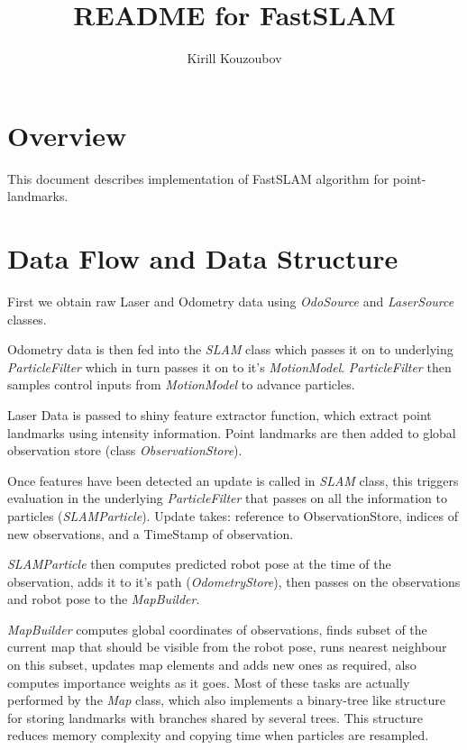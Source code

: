 \documentclass{article}
\title{README for FastSLAM}
\author{Kirill Kouzoubov}
\begin{document}
\date{}
\maketitle

\section{Overview}

This document describes implementation of FastSLAM algorithm for
point-landmarks.

\section{Data Flow and Data Structure}
First we obtain raw Laser and Odometry data using \textit{OdoSource}
and \textit{LaserSource} classes. 

Odometry data is then fed into the \textit{SLAM} class which passes it
on to underlying \textit{ParticleFilter} which in turn passes it on
to it's \textit{MotionModel}. \textit{ParticleFilter} then samples
control inputs from \textit{MotionModel} to advance particles.

Laser Data is passed to shiny feature extractor function, which
extract point landmarks using intensity information. Point landmarks
are then added to global observation store (class
\textit{ObservationStore}).

Once features have been detected an update is called in \textit{SLAM}
class, this triggers evaluation in the underlying
\textit{ParticleFilter} that passes on all the information to
particles (\textit{SLAMParticle}). Update takes: reference to
ObservationStore, indices of new observations, and a TimeStamp of
observation. 

\textit{SLAMParticle} then computes predicted robot pose at the time
of the observation, adds it to it's path (\textit{OdometryStore}),
then passes on the observations and robot pose to the
\textit{MapBuilder}.

\textit{MapBuilder} computes global coordinates of observations, finds
subset of the current map that should be visible from the robot pose,
runs nearest neighbour on this subset, updates map elements and adds
new ones as required, also computes importance weights as it
goes. Most of these tasks are actually performed by the \textit{Map}
class, which also implements a binary-tree like structure for storing
landmarks with branches shared by several trees. This structure
reduces memory complexity and copying time when particles are resampled.
\end{document}
